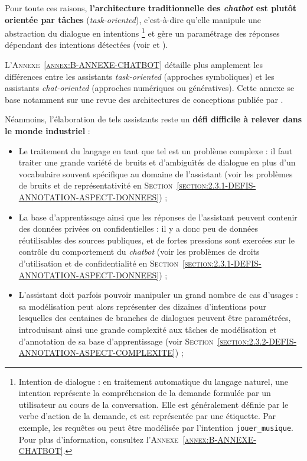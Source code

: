 	Pour toute ces raisons, \textbf{l'architecture traditionnelle des \textit{chatbot} est plutôt orientée par tâches} (\textit{task-oriented}), c'est-à-dire qu'elle manipule une abstraction du dialogue en intentions \footnote{
		Intention de dialogue : en traitement automatique du langage naturel, une intention représente la compréhension de la demande formulée par un utilisateur au cours de la conversation.
		Elle est généralement définie par le verbe d'action de la demande, et est représentée par une étiquette.
		Par exemple, les requêtes  ou  peut être modélisée par l'intention \texttt{jouer\_musique}.
		Pour plus d'information, consultez l'\textsc{Annexe~\ref{annex:B-ANNEXE-CHATBOT}}.
	} et gère un paramétrage des réponses dépendant des intentions détectées (voir \cite{chen-etal:2017:survey-dialogue-systems} et \cite{brabra-etal:2022:dialogue-management-conversational}).
	
	\begin{leftBarInformation}
		L'\textsc{Annexe~\ref{annex:B-ANNEXE-CHATBOT}} détaille plus amplement les différences entre les assistants \textit{task-oriented} (approches symboliques) et les assistants \textit{chat-oriented} (approches numériques ou génératives).
		Cette annexe se base notamment sur une revue des architectures de conceptions publiée par \cite{chen-etal:2017:survey-dialogue-systems}.
	\end{leftBarInformation}
	
	
	Néanmoins, l'élaboration de tels assistants reste un \textbf{défi difficile à relever dans le monde industriel} :
	\begin{itemize}
		\item Le traitement du langage en tant que tel est un problème complexe : il faut traiter une grande variété de bruits et d'ambiguïtés de dialogue en plus d'un vocabulaire souvent spécifique au domaine de l'assistant (voir les problèmes de bruits et de représentativité en \textsc{Section~\ref{section:2.3.1-DEFIS-ANNOTATION-ASPECT-DONNEES}}) ;
		\item La base d'apprentissage ainsi que les réponses de l'assistant peuvent contenir des données privées ou confidentielles : il y a donc peu de données réutilisables des sources publiques, et de fortes pressions sont exercées sur le contrôle du comportement du \textit{chatbot} (voir les problèmes de droits d'utilisation et de confidentialité en \textsc{Section~\ref{section:2.3.1-DEFIS-ANNOTATION-ASPECT-DONNEES}}) ;
		\item L'assistant doit parfois pouvoir manipuler un grand nombre de cas d'usages : sa modélisation peut alors représenter des dizaines d'intentions pour lesquelles des centaines de branches de dialogues peuvent être paramétrées, introduisant ainsi une grande complexité aux tâches de modélisation et d'annotation de sa base d'apprentissage (voir \textsc{Section~\ref{section:2.3.2-DEFIS-ANNOTATION-ASPECT-COMPLEXITE}}) ;
	\end{itemize}
	
